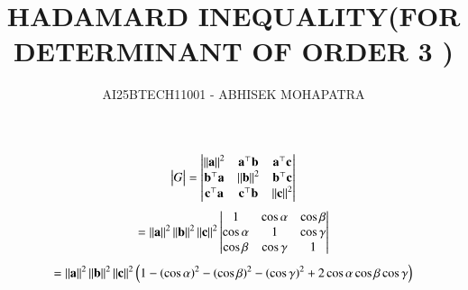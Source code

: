 \documentclass[journal,12pt,onecolumn]{IEEEtran}
\begin{document}
\title{HADAMARD INEQUALITY(FOR DETERMINANT OF ORDER 3 )}
\author{AI25BTECH11001 - ABHISEK MOHAPATRA}
{\let\newpage\relax\maketitle}
	 \begin{align}
	 \begin{vmatrix}G\end{vmatrix} = \begin{vmatrix}\left\lVert\mathbf{a}\right\rVert^2 & \mathbf{a}^\top\mathbf{b}& \mathbf{a}^\top\mathbf{c} \\ 
			 \mathbf{b}^\top\mathbf{a}&\left\lVert\mathbf{b}\right\rVert^2 & \mathbf{b}^\top\mathbf{c}\\
			 \mathbf{c}^\top\mathbf{a} &\mathbf{c}^\top\mathbf{b}&\left\lVert\mathbf{c}\right\rVert^2 \end{vmatrix}
	 \end{align}
	 \begin{align}
			 = \left\lVert\mathbf{a}\right\rVert^2 \left\lVert\mathbf{b}\right\rVert^2 \left\lVert\mathbf{c}\right\rVert^2
			 \begin{vmatrix} 1 & \cos{\alpha}& \cos{\beta} \\ 
			 \cos{\alpha}&1 & \cos{\gamma}\\
			 \cos{\beta} &\cos{\gamma}&1 \end{vmatrix}
\end{align}
	 \begin{align}
		= \left\lVert\mathbf{a}\right\rVert^2 \left\lVert\mathbf{b}\right\rVert^2 \left\lVert\mathbf{c}\right\rVert^2 \left( 1 - (\cos{\alpha})^2- (\cos{\beta})^2- (\cos{\gamma})^2 + 2\cos{\alpha}\cos{\beta}\cos{\gamma}\right)
\end{align}
\end{document}
